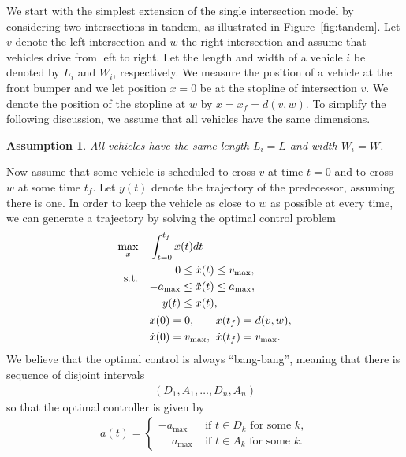 \documentclass[a4paper]{article}
\theoremstyle{definition}
\theoremstyle{plain}
\newtheorem{assump}{Assumption}
\begin{document}
We start with the simplest extension of the single intersection model by
considering two intersections in tandem, as illustrated in
Figure~\ref{fig:tandem}. Let $v$ denote the left intersection and $w$ the right
intersection and assume that vehicles drive from left to right. Let the length
and width of a vehicle $i$ be denoted by $L_{i}$ and $W_{i}$, respectively. We
measure the position of a vehicle at the front bumper and we let position $x=0$
be at the stopline of intersection $v$. We denote the position of the stopline
at $w$ by $x=x_{f}=d(v,w)$. To simplify the following discussion, we assume that all
vehicles have the same dimensions.

\begin{assump}
  \label{assump1}
  All vehicles have the same length $L_{i} = L$ and width $W_{i} = W$.
\end{assump}

Now assume that some vehicle is scheduled to cross $v$ at time $t=0$ and to
cross $w$ at some time $t_{f}$. Let $y(t)$ denote the trajectory of the
predecessor, assuming there is one. In order to keep the vehicle as close to $w$
as possible at every time, we can generate a trajectory by solving the optimal
control problem
\begin{equation}
  \begin{aligned}
  \max_{x}    \quad & \int_{t=0}^{t_{f}} x(t) dt \\
  \begin{alignedat}{2}\text{s.t.}\\ {}\end{alignedat} \quad &\begin{alignedat}{2}
                     0 \leq \; &\dot{x}(t) \leq v_{\max} , \\
                     {-a_{\max}} \leq \; &\ddot{x}(t) \leq a_{\max} , \\
                    y(t) \leq \; & x(t) , \label{eq:follow} \\
                    \end{alignedat} \\
                    &\begin{alignedat}[t]{2}
                    & x(0) = 0 , &&  x(t_{f}) = d(v,w) , \\
                    & \dot{x}(0) = v_{\max} , \;\; && \dot{x}(t_{f}) = v_{\max} .
                    \end{alignedat}
  \end{aligned}
\end{equation}
%
We believe that the optimal control is always ``bang-bang'', meaning that there
is sequence of disjoint intervals
\begin{align*}
  (D_{1}, A_{1}, \dots, D_{n}, A_{n})
\end{align*}
so that the optimal controller is given by
\begin{align*}
  a(t) = \begin{cases}
           {-a_{\max}} &\text{ if } t \in D_{k} \text{ for some } k , \\
           \phantom{-} a_{\max}   &\text{ if } t \in A_{k} \text{ for some } k .
         \end{cases}
\end{align*}
\end{document}
